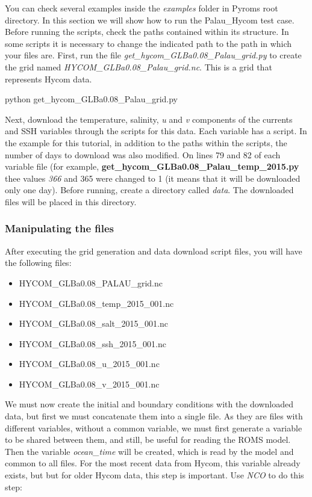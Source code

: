 \noindent You can check several examples inside the \textit{examples} folder in Pyroms root directory. In this section 
we will show how to run the Palau\_Hycom test case. Before running the scripts, check the paths contained within its structure. 
In some scripts it is necessary to change the indicated path to the path in which your files are. First, run the file \textit{get\_hycom\_GLBa0.08\_Palau\_grid.py}
to create the grid named \textit{HYCOM\_GLBa0.08\_Palau\_grid.nc}. This is a grid that represents Hycom data.
\bigskip

\begin{bashcode}
python get_hycom_GLBa0.08_Palau_grid.py
\end{bashcode}
\bigskip

\noindent Next, download the temperature, salinity, \textit{u} and \textit{v} components of the currents and SSH variables 
through the scripts for this data. Each variable has a script. In the example for this tutorial, in addition to the paths within the scripts, the number of days 
to download was also modified. On lines 79 and 82 of each variable file (for example, \textbf{get\_hycom\_GLBa0.08\_Palau\_temp\_2015.py} thee values \textit{366} and
365 were changed to 1 (it means that it will be downloaded only one day). Before running, create a directory called \textit{data}. The downloaded files will be placed in
this directory.
\bigskip

\subsubsection{Manipulating the files}
\bigskip

\noindent After executing the grid generation and data download script files, you will have the following files:
\bigskip

\begin{itemize}
    \item HYCOM\_GLBa0.08\_PALAU\_grid.nc
    \item HYCOM\_GLBa0.08\_temp\_2015\_001.nc
    \item HYCOM\_GLBa0.08\_salt\_2015\_001.nc
    \item HYCOM\_GLBa0.08\_ssh\_2015\_001.nc   
    \item HYCOM\_GLBa0.08\_u\_2015\_001.nc
    \item HYCOM\_GLBa0.08\_v\_2015\_001.nc    
\end{itemize}

\noindent We must now create the initial and boundary conditions with the downloaded data, but first we must concatenate them into a single file. 
As they are files with different variables, without a common variable, we must first generate a variable to be shared between them, and still, be useful 
for reading the ROMS model. Then the variable \textit{ocean\_time} will be created, which is read by the model and common to all files.
For the most recent data from Hycom, this variable already exists, but but for older Hycom data, this step is important. Use \textit{NCO} to do this step:
\bigskip

